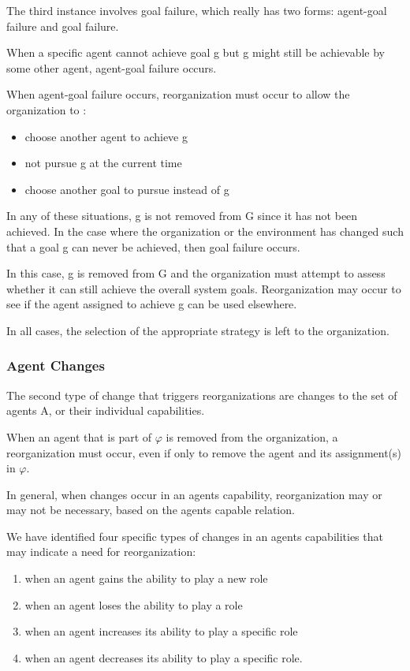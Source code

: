 The third instance involves goal failure, which really has two forms: agent-goal failure and goal failure.

When a specific agent cannot achieve goal g but g might still be achievable by some other agent, 
agent-goal failure occurs. 

When agent-goal failure occurs, reorganization must occur to allow the organization to :

\begin{itemize}
\newcommand{\localtextbulletone}{\textcolor{gray}{\raisebox{.45ex}{\rule{.6ex}{.6ex}}}}
\renewcommand{\labelitemi}{\localtextbulletone}
\item choose another agent to achieve g
\item not pursue g at the current time
\item choose another goal to pursue instead of g
\end{itemize}	
 
In any of these situations, g is not removed from G since it has not been achieved. In the case where the organization or the environment has changed such that a goal g can never be achieved, then goal failure occurs. 

In this case, g is removed from G and the organization must attempt to assess whether it can still achieve the overall system goals. Reorganization may occur to see if the agent assigned to achieve g can be used elsewhere. 

In all cases, the selection of the appropriate strategy is left to the organization\cite{omacs2}.
\subsubsection{Agent Changes}
The second type of change that triggers reorganizations are changes to the set of agents A, or their individual capabilities\cite{omacs2}.

When an agent that is part of $\varphi$ is removed from the organization, a reorganization must occur, even if only to remove the agent and its assignment(s) in $\varphi$.

In general, when changes occur in an agents capability, reorganization may or may not be necessary, based on the agents capable relation. 

We have identified four specific types of changes in an agents capabilities that may indicate a need for reorganization: 

\begin{enumerate}
\item 
	when an agent gains the ability to play a new role
\item
	when an agent loses the ability to play a role
\item
	when an agent increases its ability to play a specific role
\item
	when an agent decreases its ability to play a specific role.
\end{enumerate}	
 
